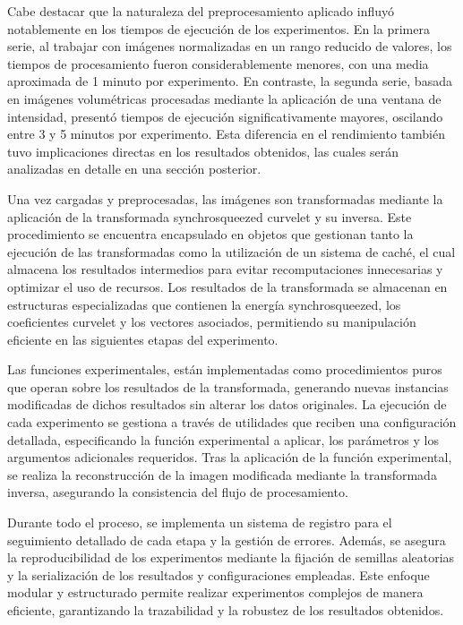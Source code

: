 Cabe destacar que la naturaleza del preprocesamiento aplicado influyó notablemente en los tiempos de ejecución de los experimentos. En la primera serie, al trabajar con imágenes normalizadas en un rango reducido de valores, los tiempos de procesamiento fueron considerablemente menores, con una media aproximada de 1 minuto por experimento. En contraste, la segunda serie, basada en imágenes volumétricas procesadas mediante la aplicación de una ventana de intensidad, presentó tiempos de ejecución significativamente mayores, oscilando entre 3 y 5 minutos por experimento. Esta diferencia en el rendimiento también tuvo implicaciones directas en los resultados obtenidos, las cuales serán analizadas en detalle en una sección posterior.%

Una vez cargadas y preprocesadas, las imágenes son transformadas mediante la aplicación de la transformada synchrosqueezed curvelet y su inversa. Este procedimiento se encuentra encapsulado en objetos que gestionan tanto la ejecución de las transformadas como la utilización de un sistema de caché, el cual almacena los resultados intermedios para evitar recomputaciones innecesarias y optimizar el uso de recursos. Los resultados de la transformada se almacenan en estructuras especializadas que contienen la energía synchrosqueezed, los coeficientes curvelet y los vectores asociados, permitiendo su manipulación eficiente en las siguientes etapas del experimento.

Las funciones experimentales, están implementadas como procedimientos puros que operan sobre los resultados de la transformada, generando nuevas instancias modificadas de dichos resultados sin alterar los datos originales. La ejecución de cada experimento se gestiona a través de utilidades que reciben una configuración detallada, especificando la función experimental a aplicar, los parámetros y los argumentos adicionales requeridos. Tras la aplicación de la función experimental, se realiza la reconstrucción de la imagen modificada mediante la transformada inversa, asegurando la consistencia del flujo de procesamiento.

Durante todo el proceso, se implementa un sistema de registro para el seguimiento detallado de cada etapa y la gestión de errores. Además, se asegura la reproducibilidad de los experimentos mediante la fijación de semillas aleatorias y la serialización de los resultados y configuraciones empleadas. Este enfoque modular y estructurado permite realizar experimentos complejos de manera eficiente, garantizando la trazabilidad y la robustez de los resultados obtenidos.

